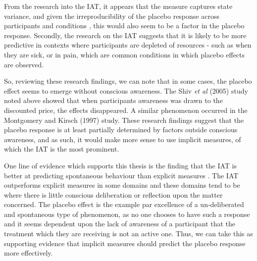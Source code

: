 From the research into the IAT, it appears that the measure captures state variance, and given the irreproducibility of the placebo response across participants and conditions \cite{Whalley2008,Shapiro1997}, this would also seem to be a factor in the placebo response. Secondly, the research on the IAT suggests that it is likely to be more predictive in contexts where participants are depleted of resources - such as when they are sick, or in pain, which are common conditions in which placebo effects are observed. 



So, reviewing these research findings, we can note that in some cases, the placebo effect seems to emerge without conscious awareness. The Shiv \textit{et al} (2005) study noted above showed that when participants awareness was drawn to the discounted price, the effects disappeared. A similar phenomenon occurred in the Montgomery and Kirsch (1997) \cite{Montgomery1997} study. These research findings suggest that the placebo response is at least partially determined by factors outside conscious awareness, and as such, it would make more sense to use implicit measures, of which the IAT is the most prominent. 



One line of evidence which supports this thesis is the finding that the IAT is better at predicting spontaneous behaviour than explicit measures \cite{Conner2005,Hofmann2005}. The IAT outperforms explicit measures in some domains \cite{Greenwald2009} and these domains tend to be where there is little conscious deliberation or reflection upon the matter concerned. The placebo effect is the example par excellence of a un-deliberated and spontaneous  type of phenomenon, as no one chooses to have such a response and it seems dependent upon the lack of awareness of a participant that the treatment which they are receiving is not an active one. Thus, we can take this as supporting evidence that implicit measures should predict the placebo response more effectively. 

